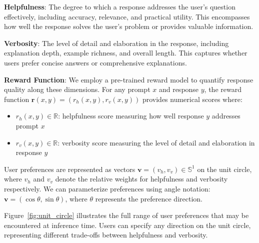 \documentclass{article} %
\begin{document}
\textbf{Helpfulness}: The degree to which a response addresses the user's question effectively, including accuracy, relevance, and practical utility. This encompasses how well the response solves the user's problem or provides valuable information.

\textbf{Verbosity}: The level of detail and elaboration in the response, including explanation depth, example richness, and overall length. This captures whether users prefer concise answers or comprehensive explanations.

\textbf{Reward Function}: We employ a pre-trained reward model to quantify response quality along these dimensions. For any prompt $x$ and response $y$, the reward function $\mathbf{r}(x, y) = (r_h(x, y), r_v(x, y))$ provides numerical scores where:
\begin{itemize}
    \item $r_h(x,y) \in \mathbb{R}$: helpfulness score measuring how well response $y$ addresses prompt $x$
    \item $r_v(x,y) \in \mathbb{R}$: verbosity score measuring the level of detail and elaboration in response $y$
\end{itemize}

User preferences are represented as vectors $\mathbf{v} = (v_h, v_v) \in \mathbb{S}^1$ on the unit circle, where $v_h$ and $v_v$ denote the relative weights for helpfulness and verbosity respectively. We can parameterize preferences using angle notation: $\mathbf{v} = (\cos\theta, \sin\theta)$, where $\theta$ represents the preference direction.

Figure~\ref{fig:unit_circle} illustrates the full range of user preferences that may be encountered at inference time. Users can specify any direction on the unit circle, representing different trade-offs between helpfulness and verbosity.
\end{document}
